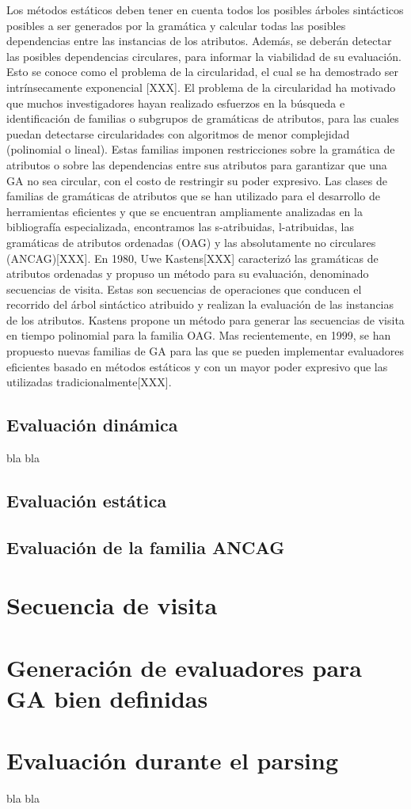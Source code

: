 Los métodos estáticos deben tener en cuenta todos los posibles árboles sintácticos posibles a ser generados por la gramática y calcular todas las posibles dependencias entre las instancias de los atributos. Además, se deberán detectar las posibles dependencias circulares, para informar la viabilidad de su evaluación.
Esto se conoce como el problema de la circularidad, el cual se ha demostrado ser intrínsecamente exponencial [XXX]. El problema de la circularidad ha motivado que muchos investigadores hayan realizado esfuerzos en la búsqueda e identificación de familias o subgrupos de gramáticas de atributos, para las cuales puedan detectarse circularidades con algoritmos de menor complejidad (polinomial o lineal).
Estas familias imponen restricciones sobre la gramática de atributos o sobre las dependencias entre sus atributos para garantizar que una GA no sea circular, con el costo de restringir su poder expresivo. 
Las clases de familias de gramáticas de atributos que se han utilizado para el desarrollo de herramientas eficientes y que se encuentran ampliamente analizadas en la bibliografía especializada, encontramos las s-atribuidas, l-atribuidas, las gramáticas de atributos ordenadas (OAG) y las absolutamente no circulares (ANCAG)[XXX]. En 1980, Uwe Kastens[XXX] caracterizó las gramáticas de atributos ordenadas y propuso un método para su evaluación, denominado secuencias de visita. Estas son secuencias de operaciones que conducen el recorrido del árbol sintáctico atribuido y realizan la evaluación de las instancias de los atributos. Kastens propone un método para generar las secuencias de visita en tiempo polinomial para la familia OAG.
Mas recientemente, en 1999, se han propuesto nuevas familias de GA para las que se pueden implementar evaluadores eficientes basado en métodos estáticos y con un mayor poder expresivo que las utilizadas tradicionalmente[XXX].



\subsection{Evaluación dinámica}

bla bla

\subsection{Evaluación estática}

\subsection{Evaluación de la familia ANCAG}
\section{Secuencia de visita}
\section{Generación de evaluadores para GA bien definidas}
\section{Evaluación durante el parsing}

bla bla

